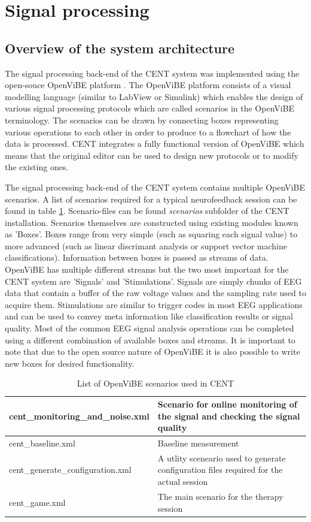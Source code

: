 \section{Signal processing}

\subsection{Overview of the system architecture}
The signal processing back-end of the CENT system was implemented using the open-souce OpenViBE platform \cite{renard2010openvibe}. The OpenViBE platform consists of a visual modelling language (similar to LabView or Simulink) which enables the design of various signal processing protocols which are called scenarios in the OpenViBE terminology. The scenarios can be drawn by connecting boxes representing various operations to each other in order to produce to a flowchart of how the data is processed. CENT integrates a fully functional version of OpenViBE which means that the original editor can be used to design new protocols or to modify the existing ones.

The signal processing back-end of the CENT system contains multiple OpenViBE scenarios. A list of scenarios required for a typical neurofeedback session can be found in table \ref{scenariolist}. Scenario-files can be found \textit{scenarios} subfolder of the CENT installation. Scenarios themselves are constructed using existing modules known as 'Boxes'. Boxes range from very simple (such as squaring each signal value) to more advanced (such as linear discrimant analysis or support vector machine classifications). Information between boxes is passed as streams of data. OpenViBE has multiple different streams but the two most important for the CENT system are 'Signals' and 'Stimulations'. Signals are simply chunks of EEG data that contain a buffer of the raw voltage values and the sampling rate used to acquire them. Stimulations are similar to trigger codes in most EEG applications and can be used to convey meta information like classification results or signal quality. Most of the common EEG signal analysis operations can be completed using a different combination of available boxes and streams. It is important to note that due to the open source nature of OpenViBE it is also possible to write new boxes for desired functionality.

\begin{table}[h]
\centering
\begin{tabular}{ll}
	\hline
	cent\_monitoring\_and\_noise.xml & Scenario for online monitoring of the 
	signal and checking the signal quality \\
	\hline
	cent\_baseline.xml & Baseline measurement \\
	\hline
	cent\_generate\_configuration.xml & A utlity sceneario used to generate configuration files required for the actual session \\
	\hline
	cent\_game.xml & The main scenario for the therapy session \\
	\hline
\end{tabular}
    \caption{List of OpenViBE scenarios used in CENT}\label{scenariolist}
\end{table}

